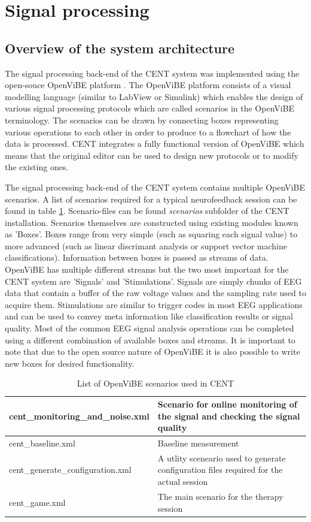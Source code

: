 \section{Signal processing}

\subsection{Overview of the system architecture}
The signal processing back-end of the CENT system was implemented using the open-souce OpenViBE platform \cite{renard2010openvibe}. The OpenViBE platform consists of a visual modelling language (similar to LabView or Simulink) which enables the design of various signal processing protocols which are called scenarios in the OpenViBE terminology. The scenarios can be drawn by connecting boxes representing various operations to each other in order to produce to a flowchart of how the data is processed. CENT integrates a fully functional version of OpenViBE which means that the original editor can be used to design new protocols or to modify the existing ones.

The signal processing back-end of the CENT system contains multiple OpenViBE scenarios. A list of scenarios required for a typical neurofeedback session can be found in table \ref{scenariolist}. Scenario-files can be found \textit{scenarios} subfolder of the CENT installation. Scenarios themselves are constructed using existing modules known as 'Boxes'. Boxes range from very simple (such as squaring each signal value) to more advanced (such as linear discrimant analysis or support vector machine classifications). Information between boxes is passed as streams of data. OpenViBE has multiple different streams but the two most important for the CENT system are 'Signals' and 'Stimulations'. Signals are simply chunks of EEG data that contain a buffer of the raw voltage values and the sampling rate used to acquire them. Stimulations are similar to trigger codes in most EEG applications and can be used to convey meta information like classification results or signal quality. Most of the common EEG signal analysis operations can be completed using a different combination of available boxes and streams. It is important to note that due to the open source nature of OpenViBE it is also possible to write new boxes for desired functionality.

\begin{table}[h]
\centering
\begin{tabular}{ll}
	\hline
	cent\_monitoring\_and\_noise.xml & Scenario for online monitoring of the 
	signal and checking the signal quality \\
	\hline
	cent\_baseline.xml & Baseline measurement \\
	\hline
	cent\_generate\_configuration.xml & A utlity sceneario used to generate configuration files required for the actual session \\
	\hline
	cent\_game.xml & The main scenario for the therapy session \\
	\hline
\end{tabular}
    \caption{List of OpenViBE scenarios used in CENT}\label{scenariolist}
\end{table}

